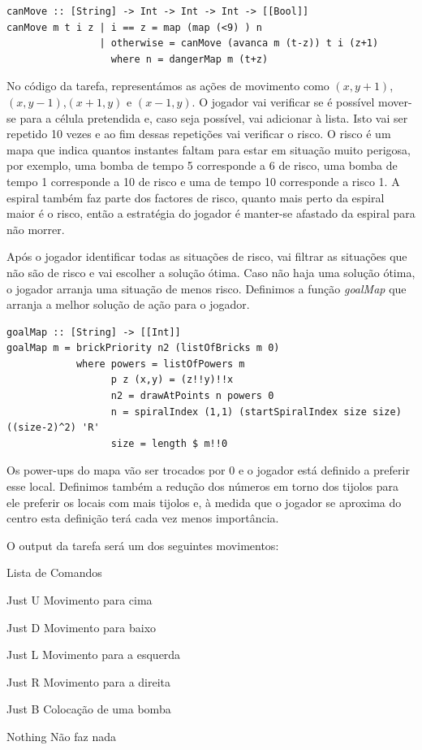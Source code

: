 \documentclass[a4paper]{article}
\begin{document}
\begin{verbatim}
canMove :: [String] -> Int -> Int -> Int -> [[Bool]]
canMove m t i z | i == z = map (map (<9) ) n
                | otherwise = canMove (avanca m (t-z)) t i (z+1)
                  where n = dangerMap m (t+z)
\end{verbatim}

No código da tarefa, representámos as ações de movimento como $(x,y+1)$,$(x,y-1)$,$(x+1,y)$ e $(x-1,y)$. O jogador vai verificar se é possível mover-se para a célula pretendida e, caso seja possível, vai adicionar à lista. Isto vai ser repetido 10 vezes e ao fim dessas repetições vai verificar o risco. O risco é um mapa que indica quantos instantes faltam para estar em situação muito perigosa, por exemplo, uma bomba de tempo 5 corresponde a 6 de risco, uma bomba de tempo 1 corresponde a 10 de risco e uma de tempo 10 corresponde a risco 1. A espiral também faz parte dos factores de risco, quanto mais perto da espiral maior é o risco, então a estratégia do jogador é manter-se afastado da espiral para não morrer.\par Após o jogador identificar todas as situações de risco, vai filtrar as situações que não são de risco e vai escolher a solução ótima. Caso não haja uma solução ótima, o jogador arranja uma situação de menos risco. Definimos a função \emph{goalMap} que arranja a melhor solução de ação para o jogador.

\begin{verbatim}
goalMap :: [String] -> [[Int]]
goalMap m = brickPriority n2 (listOfBricks m 0)
            where powers = listOfPowers m
                  p z (x,y) = (z!!y)!!x
                  n2 = drawAtPoints n powers 0
                  n = spiralIndex (1,1) (startSpiralIndex size size) ((size-2)^2) 'R'
                  size = length $ m!!0
\end{verbatim}

Os power-ups do mapa vão ser trocados por 0 e o jogador está definido a preferir esse local. Definimos também a redução dos números em torno dos tijolos para ele preferir os locais com mais tijolos e, à medida que o jogador se aproxima do centro esta definição terá cada vez menos importância.

\newpage

O output da tarefa será um dos seguintes movimentos:

\begin{labeling}{Lista de Comandos}
      \item [Just U] Movimento para cima
      \item [Just D] Movimento para baixo 
      \item [Just L] Movimento para a esquerda
      \item [Just R] Movimento para a direita
      \item [Just B] Colocação de uma bomba
      \item [Nothing] Não faz nada
\end{labeling}
\end{document}
